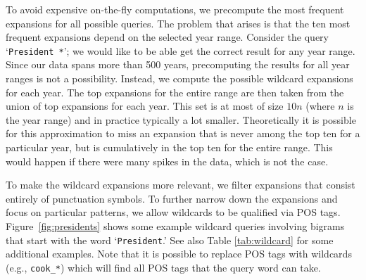 \documentclass[11pt,a4paper]{article}
\newcommand{\query}[1]{\texttt{#1}}
\begin{document}
 To avoid expensive on-the-fly computations, we precompute the most frequent expansions for all possible queries. The problem that arises is that the ten most frequent expansions depend on the selected year range. Consider the query `\query{President *}'; we would like to be able get the correct result for any year range. Since our data spans more than 500 years, precomputing the results for all year ranges is not a possibility. Instead, we compute the possible wildcard expansions for each year. The top expansions for the entire range are then taken from the union of top expansions for each year. This set is at most of size $10n$ (where $n$ is the year range) and in practice typically a lot smaller. Theoretically it is possible for this approximation to miss an expansion that is never among the top ten for a particular year, but is cumulatively in the top ten for the entire range. This would happen if there were many spikes in the data, which is not the case.

	To make the wildcard expansions more relevant, we filter expansions that consist entirely of punctuation symbols. To further narrow down the expansions and focus on particular patterns, we allow wildcards to be qualified via POS tags. Figure~\ref{fig:presidents} shows some example wildcard queries involving bigrams that start with the word `\query{President}.' See also Table \ref{tab:wildcard} for some additional examples. Note that it is possible to replace POS tags with wildcards (e.g., \query{cook\_*}) which will find all POS tags that the query word can take.
\end{document}
